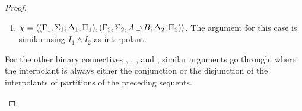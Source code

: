 \begin{proof}
\begin{description}
\begin{itemize}
\begin{enumerate}
							{


								To show that also condition \ref{maehcond3} is satisfied, consider that by the induction hypothesis, it holds that:
								\begin{align*}
									\Lang(I_1) &\subseteq \Lang(\Gamma_1, \Delta_1, A) \cap \Lang(\Gamma_2, \Delta_2) \\
									\Lang(I_2) &\subseteq \Lang(\Sigma_1, B, \Pi_1) \cap \Lang(\Sigma_2, \Pi_2)
								\end{align*}\nopagebreak
								Therefore:
								\vspace{-\baselineskip}
								\begin{adjustwidth}{-4em}{}
								\begin{align*}
									\Lang(I_1) \cup \Lang(I_2) &\subseteq
									(\Lang(\Gamma_1, \Delta_1, A) \cap \Lang(\Gamma_2, \Delta_2)) \cup ( \Lang(\Sigma_1, B, \Pi_1) \cap \Lang(\Sigma_2, \Pi_2))  \\
									&\Downarrow \\
									\Lang(I_1) \cup \Lang(I_2) &\subseteq
									(\Lang(\Gamma_1, \Delta_1, A) \cup \Lang(\Sigma_1, B, \Pi_1)) \cap (\Lang(\Gamma_2, \Delta_2) \cup \Lang(\Sigma_2, \Pi_2)) \\
									&\Updownarrow \\
									\Lang(I_1 \lor I_2) &\subseteq \Lang(\Gamma_1, \Sigma_1, A\limpl B, \Delta_1, \Pi_1) \cap \Lang(\Gamma_2, \Sigma_2, \Delta_2, \Pi_2)
								\end{align*}
							\end{adjustwidth}
							\medskip

							}

						\item $\chi =  \langle (\Gamma_1, \Sigma_1; \Delta_1, \Pi_1),\allowbreak (\Gamma_2, \Sigma_2, A\operatorname{\supset} B; \Delta_2, \Pi_2)\rangle $.
							The argument for this case is similar using $I_1 \land I_2$ as interpolant.
					\end{enumerate}


					For the other binary connectives , , ,  and , similar arguments go through, where the interpolant is always either the conjunction or the disjunction of the interpolants of partitions of the preceding sequents.

			\end{itemize}


\end{description}
\end{proof}
